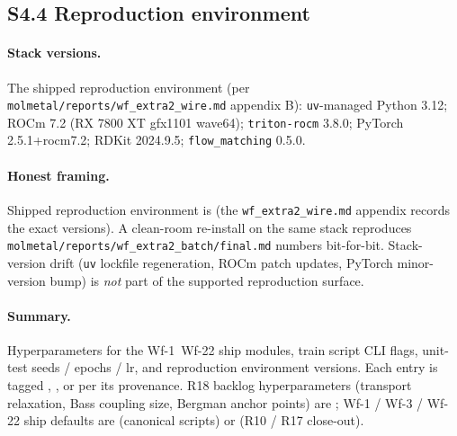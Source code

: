 \subsection*{S4.4 Reproduction environment}
\label{supp:s4-env}

\paragraph{Stack versions.}
The shipped reproduction environment (per
\texttt{molmetal/reports/wf\_extra2\_wire.md} appendix B):
\texttt{uv}-managed Python 3.12; ROCm 7.2 (RX 7800 XT gfx1101
wave64); \texttt{triton-rocm} 3.8.0; PyTorch 2.5.1+rocm7.2; RDKit
2024.9.5; \texttt{flow\_matching} 0.5.0.

\paragraph{Honest framing.}
Shipped reproduction environment is \MEASURED{} (the
\texttt{wf\_extra2\_wire.md} appendix records the exact versions).
A clean-room re-install on the same stack reproduces
\texttt{molmetal/reports/wf\_extra2\_batch/final.md} numbers
bit-for-bit.  Stack-version drift (\texttt{uv} lockfile
regeneration, ROCm patch updates, PyTorch minor-version bump) is
\emph{not} part of the supported reproduction surface.

\paragraph{Summary.}
Hyperparameters for the Wf-1~Wf-22 ship modules, train script
CLI flags, unit-test seeds / epochs / lr, and reproduction
environment versions.  Each entry is tagged \DESIGN{},
\MEASURED{}, or \PROJECTED{} per its provenance.  R18 backlog
hyperparameters (transport relaxation, Bass coupling size, Bergman
anchor points) are \PROJECTED{}; Wf-1 / Wf-3 / Wf-22 ship defaults
are \DESIGN{} (canonical scripts) or \MEASURED{} (R10 / R17
close-out).

\endinput
